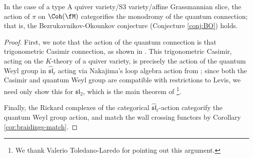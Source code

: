 \begin{theorem}
  In the case of a type A quiver variety/S3 variety/affine
  Grassmannian slice, the action of $\pi$ on $\Coh(\fM)$ categorifies
  the monodromy of the quantum connection; that is, the
  Bezrukavnikov-Okounkov conjecture (Conjecture \ref{conj:BO}) holds. 
\end{theorem}
\begin{proof}
  First, we note that the action of the quantum connection is that
  trigonometric Casimir connection, as shown in \cite[(1.14)]{MaOk}.
  This trigonometric Casimir, acting on the $K$-theory of a quiver
  variety, is precisely the action of the quantum Weyl group in
  $\mathfrak{\widehat{sl}}_\ell$ acting via Nakajima's loop algebra
  action from \cite{Na}; since both the Casimir and quantum
  Weyl group are compatible with restrictions to Levis, we need only
  show this for $\mathfrak{sl}_2$, which is the main theorem of
  \cite{GTLsl2}\footnote{We thank Valerio Toledano-Laredo for pointing
    out this argument.}.
  
Finally, the Rickard complexes of the categorical
$\mathfrak{\widehat{sl}}_\ell$-action categorify the quantum Weyl
group action, and match the wall crossing functors by Corollary  \ref{cor:braidings-match}.



\end{proof}
